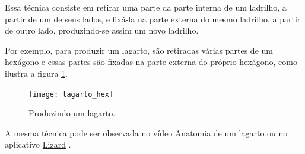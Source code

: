 Essa técnica consiste em retirar uma parte da parte interna de um ladrilho, a partir de um de seus lados, e fixá-la na parte externa do mesmo ladrilho, a partir de outro lado, produzindo-se assim um novo ladrilho.

Por exemplo, para produzir um lagarto, são retiradas várias partes de um hexágono e essas partes são fixadas na parte externa do próprio hexágono, como ilustra a figura \ref{lagarto_hex}.


 \begin{figure}[H]
	\centering
	\texttt{[image: lagarto\_hex]}
	\label{lagarto_hex}
\caption{Produzindo um lagarto.}
	\end{figure}

A mesma técnica pode ser observada no vídeo \href{ https://youtu.be/T6L6bE_bTMo}{Anatomia de um lagarto} ou no  aplicativo \href{https://www.geogebra.org/m/zs2ud4w5} {Lizard} .





